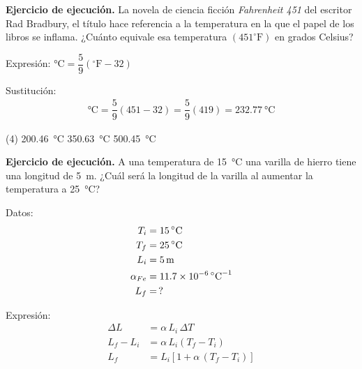 \documentclass[12pt, letter]{exam}
\begin{document}
\begin{questions}
    \setcounter{question}{42} \question \label{Ejercicio_13} \textbf{Ejercicio de ejecución. } La novela de ciencia ficción \textit{Fahrenheit 451} del escritor Rad Bradbury, el título hace referencia a la temperatura en la que el papel de los libros se inflama. ¿Cuánto equivale esa temperatura $(451 ^{\circ}\text{F})$ en grados Celsius?

    Expresión: $\unit{\degreeCelsius} = \dfrac{5}{9} \left( ^{\circ}\text{F} - 32 \right)$

    Sustitución:
    \begin{align*}
        \unit{\degreeCelsius} = \dfrac{5}{9} \left( 451 - 32 \right) = \dfrac{5}{9} \left( 419\right) = \SI{232.77}{\degreeCelsius}
    \end{align*}
    \begin{tasks}(4)
        \task \SI{200.46}{\degreeCelsius}
        \task {}
        \task \SI{350.63}{\degreeCelsius}
        \task \SI{500.45}{\degreeCelsius}
    \end{tasks}
    \setcounter{question}{43} \question \label{Ejercicio_14} \textbf{Ejercicio de ejecución. } A una temperatura de \SI{15}{\degreeCelsius} una varilla de hierro tiene una longitud de \SI{5}{\meter}. ¿Cuál será la longitud de la varilla al aumentar la temperatura a \SI{25}{\degreeCelsius}?

    \begin{minipage}[t]{0.35\linewidth}
    Datos: 
    \begin{align*}
    T_{i} &= \SI{15}{\degreeCelsius} \\
    T_{f} &= \SI{25}{\degreeCelsius} \\
    L_{i} &= \SI{5}{\meter} \\
    \alpha_{Fe} &= \SI{11.7d-6}{\degreeCelsius}^{-1} \\
    L_{f} &= \, ?
    \end{align*}
    \end{minipage}
    \hspace{1cm}
    \begin{minipage}[t]{0.4\linewidth}
    Expresión:
    \begin{align*}
        \Delta L &= \alpha \, L_{i} \, \Delta T \\[0.5em]
        L_{f} - L_{i} &= \alpha \, L_{i} \left( T_{f} - T_{i} \right) \\[0.5em] 
        L_{f} &= L_{i} \left[ 1 + \alpha \, \left( T_{f} - T_{i} \right) \right]
    \end{align*}
    \end{minipage}
    

\end{questions}
\end{document}
